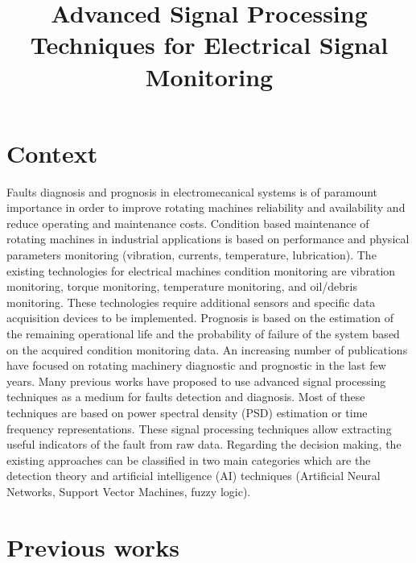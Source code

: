 \documentclass{article}
\begin{document}
\title{Advanced Signal Processing Techniques for Electrical Signal Monitoring}
   
 \maketitle  
 

\section{Context}

Faults diagnosis and prognosis in electromecanical systems is of paramount importance in order to improve rotating machines reliability and availability and reduce operating and maintenance costs. Condition based maintenance of rotating machines in industrial applications is based on performance and physical parameters monitoring (vibration, currents, temperature, lubrication). The existing technologies for electrical machines condition monitoring are vibration monitoring, torque monitoring, temperature monitoring, and oil/debris monitoring. These technologies require additional sensors and specific data acquisition devices to be implemented. Prognosis is based on the estimation of the remaining operational life and the probability of failure of the system based on the acquired condition monitoring data. An increasing number of publications have focused on rotating machinery diagnostic and prognostic in the last few years. Many previous works have proposed to use advanced signal processing techniques as a medium for faults detection and diagnosis. Most of these techniques are based on power spectral density (PSD) estimation or time frequency representations. These signal processing techniques allow extracting useful indicators of the fault from raw data. Regarding the decision making, the existing approaches can be classified in two main categories which are the detection theory and artificial intelligence (AI) techniques (Artificial Neural Networks,  Support Vector Machines, fuzzy logic).


\section{Previous works}
\end{document}
